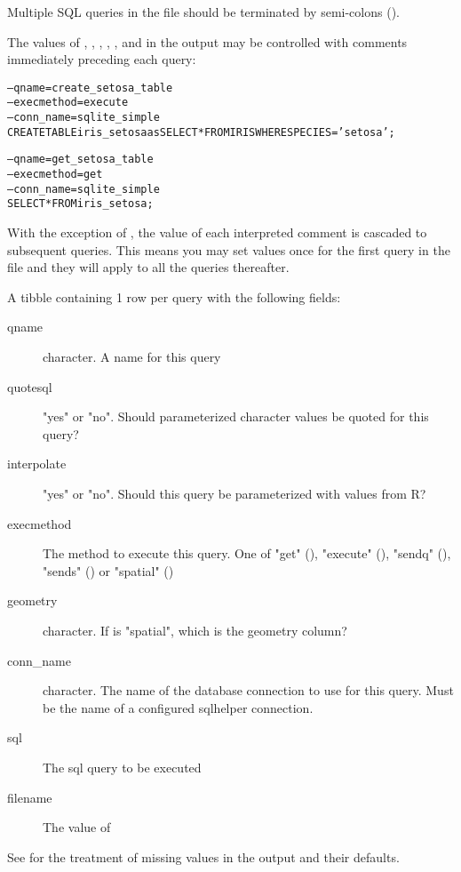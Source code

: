 \documentclass[a4paper]{book}
\begin{document}
%
\begin{Details}\relax
Multiple SQL queries in the file should be terminated by semi-colons (\AsIs{;}).

The values of , , , , ,
and  in the output may be controlled with comments
immediately preceding each query:

\begin{alltt}-- qname = create_setosa_table
-- execmethod = execute
-- conn_name = sqlite_simple
CREATE TABLE iris_setosa as SELECT * FROM IRIS WHERE SPECIES = 'setosa';

-- qname = get_setosa_table
-- execmethod = get
-- conn_name = sqlite_simple
SELECT * FROM iris_setosa;
\end{alltt}


With the exception of , the value of each interpreted comment is
cascaded to subsequent queries. This means you may set values once for the
first query in the file and they will apply to all the queries thereafter.
\end{Details}
%
\begin{Value}
A tibble containing 1 row per query with the following fields:
\begin{description}

\item[qname] character. A name for this query
\item[quotesql] "yes" or "no". Should parameterized character values be quoted for this query?
\item[interpolate] "yes" or "no". Should this query be parameterized with values from R?
\item[execmethod] The method to execute this query.
One of "get" (), "execute" (), "sendq" (), "sends" () or "spatial" ()
\item[geometry] character. If  is "spatial", which is the geometry column?
\item[conn\_name] character. The name of the database connection to use for this query.
Must be the name of a configured sqlhelper connection.
\item[sql] The sql query to be executed
\item[filename] The value of 

\end{description}


See  for the treatment of missing values in the output and their
defaults.
\end{Value}
\end{document}
